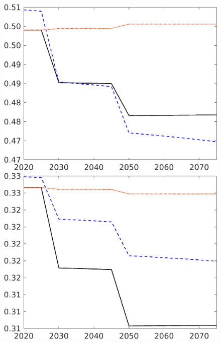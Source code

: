 \begin{figure}[h!!]
\begin{minipage}[]{0.24\textwidth}
	\end{minipage}
\begin{minipage}[]{0.24\textwidth}
	\includegraphics[width=1\textwidth]{../../codding_model/own_basedOnFried/optimalPol_elastS_DisuSci/figures/all_1705/hh_CompEffOPT_T_NoTaus_spillover0_sep1_BN0_ineq0_red0_etaa0.79_lgd0.png}
\end{minipage}
\begin{minipage}[]{0.24\textwidth}
	\includegraphics[width=1\textwidth]{../../codding_model/own_basedOnFried/optimalPol_elastS_DisuSci/figures/all_1705/hl_CompEffOPT_T_NoTaus_spillover0_sep1_BN0_ineq0_red0_etaa0.79_lgd0.png}
\end{minipage}
\end{figure} 

